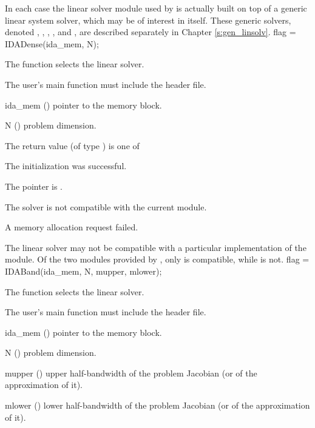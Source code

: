 In each case the linear
solver module used by {\ida} is actually built on top of a generic
linear system solver, which may be of interest in itself.  These
generic solvers, denoted {\dense}, {\band}, {\spgmr}, {\spbcg}, and {\sptfqmr}, are described
separately in Chapter \ref{s:gen_linsolv}.
{
  flag = IDADense(ida\_mem, N);
}
{
  The function  selects the {\idadense} linear solver. 

  The user's main function must include the  header file.
}
{
  \begin{args}
  \item[ida\_mem] ()
    pointer to the {\ida} memory block.
  \item[N] ()
    problem dimension.
  \end{args}
}
{
  The return value  (of type ) is one of
  \begin{args}
  \item[\Id{IDADENSE\_SUCCESS}] 
    The {\idadense} initialization was successful.
  \item[\Id{IDADENSE\_MEM\_NULL}]
    The  pointer is .
  \item[\Id{IDADENSE\_ILL\_INPUT}]
    The {\idadense} solver is not compatible with the current {\nvector} module.
  \item[\Id{IDADENSE\_MEM\_FAIL}]
    A memory allocation request failed.
  \end{args}
}
{
  The {\idadense} linear solver may not be compatible with a particular
  implementation of the {\nvector} module. 
  Of the two {\nvector} modules provided by {\sundials}, only {\nvecs} is 
  compatible, while {\nvecp} is not.
}
{
  flag = IDABand(ida\_mem, N, mupper, mlower);
}
{
  The function  selects the {\idaband} linear solver. 

  The user's main function must include the  header file.
}
{
  \begin{args}
  \item[ida\_mem] ()
    pointer to the {\ida} memory block.
  \item[N] ()
    problem dimension.
  \item[mupper] ()
    upper half-bandwidth of the problem Jacobian (or of the approximation of it).
  \item[mlower] ()
    lower half-bandwidth of the problem Jacobian (or of the approximation of it).
  \end{args}
}
